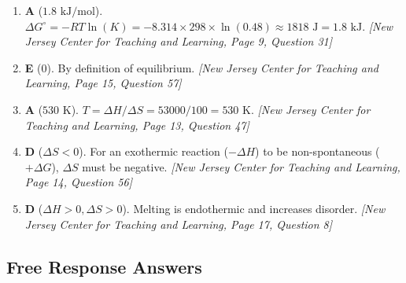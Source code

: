 \documentclass[12pt,letterpaper]{article}
\begin{document}
\begin{enumerate}
    \item \textbf{A} ($1.8\text{ kJ/mol}$). $\Delta G^\circ = -RT\ln(K) = -8.314 \times 298 \times \ln(0.48) \approx 1818\text{ J} = 1.8\text{ kJ}$. \textit{[New Jersey Center for Teaching and Learning, Page 9, Question 31]}
    
    \item \textbf{E} ($0$). By definition of equilibrium. \textit{[New Jersey Center for Teaching and Learning, Page 15, Question 57]}
    
    \item \textbf{A} ($530\text{ K}$). $T = \Delta H / \Delta S = 53000 / 100 = 530\text{ K}$. \textit{[New Jersey Center for Teaching and Learning, Page 13, Question 47]}
    
    \item \textbf{D} ($\Delta S < 0$). For an exothermic reaction ($-\Delta H$) to be non-spontaneous ($+\Delta G$), $\Delta S$ must be negative. \textit{[New Jersey Center for Teaching and Learning, Page 14, Question 56]}
    
    \item \textbf{D} ($\Delta H > 0, \Delta S > 0$). Melting is endothermic and increases disorder. \textit{[New Jersey Center for Teaching and Learning, Page 17, Question 8]}
\end{enumerate}

\subsection*{Free Response Answers}
\end{document}

